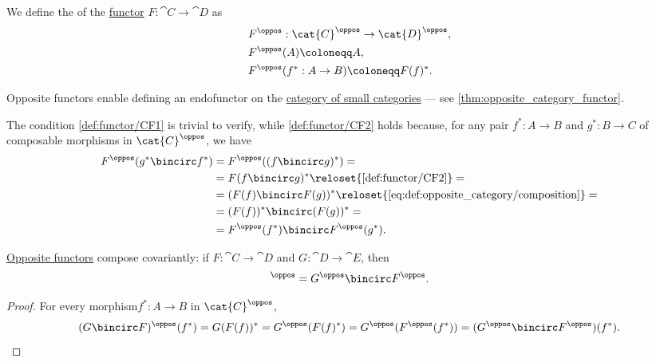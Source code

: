 \begin{definition}\label{def:opposite_functor}
  We define the  of the \hyperref[def:functor]{functor} \( F: \cat{C} \to \cat{D} \) as
  \begin{equation*}
    \begin{aligned}
      &F^\oppos: \cat{C}^\oppos \to \cat{D}^\oppos, \\
      &F^\oppos(A) \coloneqq A, \\
      &F^\oppos(f^*: A \to B) \coloneqq F(f)^*.
    \end{aligned}
  \end{equation*}
\end{definition}
\begin{comments}
  \item Opposite functors enable defining an endofunctor on the \hyperref[def:category_of_small_categories]{category of small categories} --- see \cref{thm:opposite_category_functor}.
\end{comments}
\begin{defproof}
  The condition \ref{def:functor/CF1} is trivial to verify, while \ref{def:functor/CF2} holds because, for any pair \( f^*: A \to B \) and \( g^*: B \to C \) of composable morphisms in \( \cat{C}^\oppos \), we have
  \begin{align*}
    F^\oppos(g^* \bincirc f^*)
    &=
    F^\oppos((f \bincirc g)^*)
    = \\ &=
    F(f \bincirc g)^*
    \reloset{\ref{def:functor/CF2}} = \\ &=
    (F(f) \bincirc F(g))^*
    \reloset {\eqref{eq:def:opposite_category/composition}} = \\ &=
    (F(f))^* \bincirc (F(g))^*
    = \\ &=
    F^\oppos(f^*) \bincirc F^\oppos(g^*).
  \end{align*}
\end{defproof}

\begin{lemma}\label{thm:composition_of_opposite_functors}
  \hyperref[def:opposite_functor]{Opposite functors} compose covariantly: if \( F: \cat{C} \to \cat{D} \) and \( G: \cat{D} \to \cat{E} \), then
  \begin{equation*}
    [G \bincirc F]^\oppos = G^\oppos \bincirc F^\oppos.
  \end{equation*}
\end{lemma}
\begin{proof}
  For every morphism\( f^*: A \to B \) in \( \cat{C}^\oppos \),
  \begin{equation*}
    (G \bincirc F)^\oppos(f^*)
    =
    G(F(f))^*
    =
    G^\oppos(F(f)^*)
    =
    G^\oppos(F^\oppos(f^*))
    =
    (G^\oppos \bincirc F^\oppos)(f^*).
  \end{equation*}
\end{proof}

